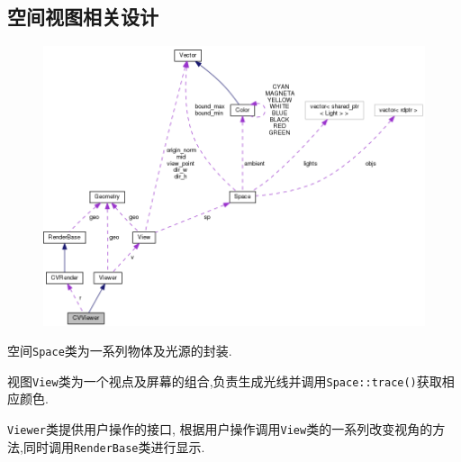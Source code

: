 \subsection{空间视图相关设计}
\begin{figure}[H]
  \centering
  \includegraphics[scale=0.4]{res/viewer_diagram.png}
\end{figure}
空间\verb|Space|类为一系列物体及光源的封装.

视图\verb|View|类为一个视点及屏幕的组合,负责生成光线并调用\verb|Space::trace()|获取相应颜色.

\verb|Viewer|类提供用户操作的接口,
根据用户操作调用\verb|View|类的一系列改变视角的方法,同时调用\verb|RenderBase|类进行显示.
